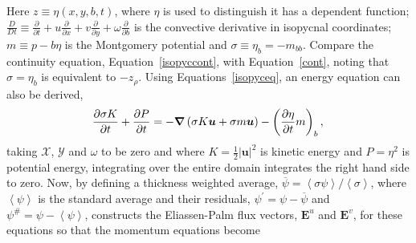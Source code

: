 \documentclass[12pt,a4paper]{report}
\newcommand*\thkmean[1]{\overline{#1}}
\newcommand*\thkres[1]{{#1}^{\prime}}
\newcommand*\nthkmean[1]{\left\langle{#1}\right\rangle}
\newcommand*\nthkres[1]{{#1}^{\#}}
\newcommand*\equref[1]{Equation~\eqref{#1}}
\newcommand*{\half}{\frac{1}{2}}
\begin{document}
                 Here $z \equiv \eta(x,y,b,t) $, where $\eta$ is used to distinguish 
                 it has a dependent function; $\frac{D}{Dt} \equiv \frac{\partial}{\partial t}
                 + u\frac{\partial}{\partial x} + v\frac{\partial}{\partial y}
                 + \omega\frac{\partial}{\partial b}$ is the
                  convective derivative in isopycnal coordinates; $m \equiv p-b\eta$ is the 
                  Montgomery potential and $\sigma \equiv \eta_{b} = -m_{bb}$.
                  Compare the continuity equation, \equref{isopyccont}, with 
                  \equref{cont}, noting that
                  $\sigma = \eta_{b}$ is equivalent to $-z_{\rho}$. Using Equations~\eqref{isopyceq}, an energy equation can also be derived,
                  \begin{equation}
                  \frac{\partial \sigma K}{\partial t} + \frac{\partial P}{\partial t} = -\boldsymbol{\nabla}\left(\sigma K \boldsymbol{u} +
                  \sigma m \boldsymbol{u}\right) -\left(\frac{\partial \eta}{\partial t} m\right)_{b}, \\
                  \label{isopycenergyeq}
                  \end{equation}
                  taking $\mathcal{X}$, $\mathcal{Y}$ and $\omega$ to be zero and where $K=\half \left| \boldsymbol{u}\right|^{2}$ is kinetic energy and
                  $P=\eta^{2}$ is potential energy, integrating over the entire domain
                  integrates the right hand side to zero. 
                  Now, by defining a thickness weighted average,
                  $\thkmean{\psi}=\nthkmean{\sigma\psi}/\nthkmean{\sigma}$, where
                  $\nthkmean{\psi}$ is the standard average and their residuals,
                  $\thkres{\psi}=\psi-\thkmean{\psi}$ and $\nthkres{\psi}=\psi-\nthkmean{\psi}$,
                  \cite{young2012exact} constructs the Eliassen-Palm flux vectors, 
                  $\boldsymbol{E}^{u}$ and $\boldsymbol{E}^{v}$,  for
                  these equations so that the momentum equations become
\end{document}

